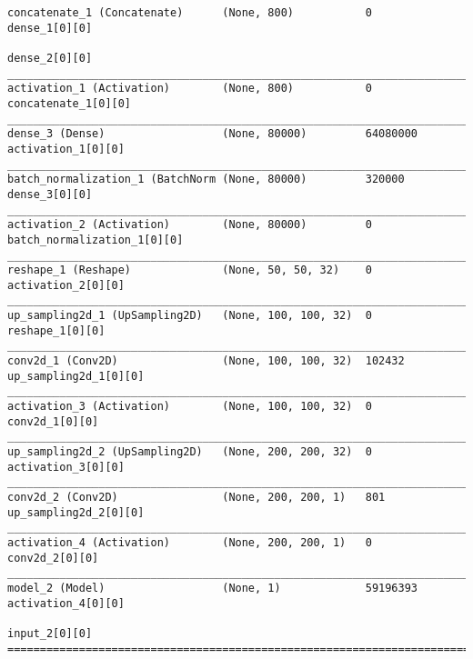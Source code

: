 \documentclass{article}
\begin{document}
\begin{verbatim}
concatenate_1 (Concatenate)      (None, 800)           0           dense_1[0][0]                    
                                                                   dense_2[0][0]                    
____________________________________________________________________________________________________
activation_1 (Activation)        (None, 800)           0           concatenate_1[0][0]              
____________________________________________________________________________________________________
dense_3 (Dense)                  (None, 80000)         64080000    activation_1[0][0]               
____________________________________________________________________________________________________
batch_normalization_1 (BatchNorm (None, 80000)         320000      dense_3[0][0]                    
____________________________________________________________________________________________________
activation_2 (Activation)        (None, 80000)         0           batch_normalization_1[0][0]      
____________________________________________________________________________________________________
reshape_1 (Reshape)              (None, 50, 50, 32)    0           activation_2[0][0]               
____________________________________________________________________________________________________
up_sampling2d_1 (UpSampling2D)   (None, 100, 100, 32)  0           reshape_1[0][0]                  
____________________________________________________________________________________________________
conv2d_1 (Conv2D)                (None, 100, 100, 32)  102432      up_sampling2d_1[0][0]            
____________________________________________________________________________________________________
activation_3 (Activation)        (None, 100, 100, 32)  0           conv2d_1[0][0]                   
____________________________________________________________________________________________________
up_sampling2d_2 (UpSampling2D)   (None, 200, 200, 32)  0           activation_3[0][0]               
____________________________________________________________________________________________________
conv2d_2 (Conv2D)                (None, 200, 200, 1)   801         up_sampling2d_2[0][0]            
____________________________________________________________________________________________________
activation_4 (Activation)        (None, 200, 200, 1)   0           conv2d_2[0][0]                   
____________________________________________________________________________________________________
model_2 (Model)                  (None, 1)             59196393    activation_4[0][0]               
                                                                   input_2[0][0]                    
====================================================================================================

\end{verbatim}
\end{document}
